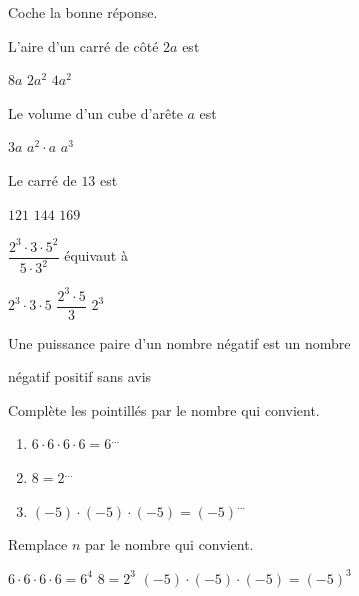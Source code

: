 \documentclass[../math2.tex]{subfiles}
\begin{document}
\begin{solution}
	Coche la bonne réponse.\par
	\begin{tasks}
		\task L'aire d'un carré de côté $2a$ est
		\begin{qcm}
			\choice $8a$
			\choice $2a^2$
			\correct $4a^2$
		\end{qcm}

		\task Le volume d'un cube d'arête $a$ est
		\begin{qcm}
			\choice $3a$
			\choice $a^2 \cdot a$
			\correct $a^3$
		\end{qcm}

		\task Le carré de $13$ est
		\begin{qcm}
			\choice $121$
			\choice $144$
			\correct $169$
		\end{qcm}

		\task $\dfrac{2^3\cdot 3\cdot 5^2}{5\cdot 3^2}$ équivaut à
		\begin{qcm}
			\correct $2^3\cdot 3\cdot 5$
			\choice $\dfrac{2^3\cdot5}{3}$
			\choice $2^3$
		\end{qcm}

		\task Une puissance paire d'un nombre négatif est un nombre
		\begin{qcm}
			\choice négatif
			\correct positif
			\choice sans avis
		\end{qcm}
	\end{tasks}
\end{solution}
\begin{exercise}
	Complète les pointillés par le nombre qui convient.
	\begin{enumerate}[itemsep=0.5cm]
		\item  $6\cdot 6 \cdot 6 \cdot 6 = 6^{\dots}$
		\item  $8=2^{\dots}$
		\item  $(-5)\cdot(-5)\cdot(-5) = (-5)^{\dots}$
	\end{enumerate}
\end{exercise}
\begin{solution}
	Remplace $n$ par le nombre qui convient.
	\begin{tasks}
		\task $6\cdot 6 \cdot 6 \cdot 6 = 6^4$
		\task $8=2^3$
		\task $(-5)\cdot(-5)\cdot(-5) = (-5)^3$
	\end{tasks}
\end{solution}
\newpage
\end{document}
